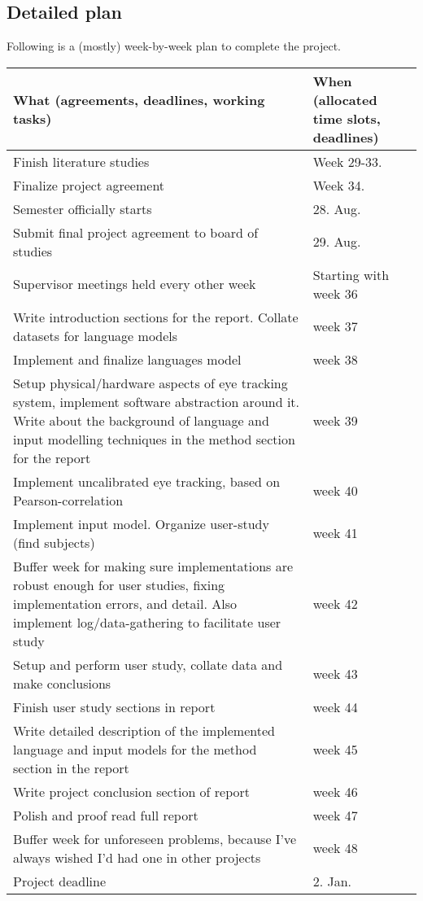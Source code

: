 \documentclass[a4paper, titlepage, 12pt, draft]{article}
\renewcommand{\%}{\scalebox{.9}{\oldpct}}
\begin{document}
\subsection*{Detailed plan}
Following is a (mostly) week-by-week plan to complete the project.
\begin{longtable}[hbt]{|p{7cm}|p{5cm}|}
	\hline
	 What (agreements, deadlines, working tasks) &
	 When (allocated time slots, deadlines) \\
	 \hline
	 \hline
	 Finish literature studies & Week 29-33. \\
	 \hline
	 Finalize project agreement & Week 34. \\
	 \hline
	 Semester officially starts & 28. Aug. \\
	 \hline
	 Submit final project agreement to board of studies & 29. Aug. \\
	 \hline
	 Supervisor meetings held every other week & Starting with week 36\\
	 \hline
	  Write introduction sections for the report.
	  Collate datasets for language models & week 37\\
	 \hline
	  Implement and finalize languages model & week 38\\
	 \hline
	  Setup physical/hardware aspects of eye tracking system, implement
	 software abstraction around it. Write about the background of language and
	 input modelling techniques in the method section for the report & week 39\\
	 \hline
	  Implement uncalibrated eye tracking, based on Pearson-correlation & week 40\\
	 \hline
	  Implement input model. Organize user-study (find subjects) & week 41\\
	 \hline
	  Buffer week for making sure implementations are robust enough for
	  user studies, fixing implementation errors, and detail. Also
	  implement log/data-gathering to facilitate user study & week 42\\
	 \hline
	  Setup and perform user study, collate data and make conclusions & week 43\\
	 \hline
	  Finish user study sections in report & week 44\\
	 \hline
	  Write detailed description of the implemented language and input
	  models for the method section in the report & week 45\\
	 \hline
	  Write project conclusion section of report & week 46\\
	 \hline
	  Polish and proof read full report& week 47\\
	 \hline
	  Buffer week for unforeseen problems, because I've always wished I'd had one in other projects & week 48\\
	 \hline
	 Project deadline & 2. Jan. \\
	\hline
\end{longtable}
\end{document}
